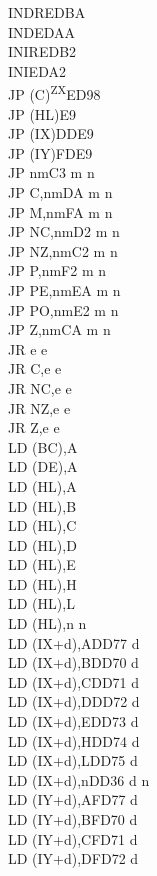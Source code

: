 \documentclass[12pt,twoside,openright,a4paper]{book}
\newcommand{\ZXN}{\textnormal{\textsuperscript{ZX}}}
\begin{document}
\begin{multicols}{3}
{\begin{tabbing}
		INDR\>EDBA\\
		IND\>EDAA\\
		INIR\>EDB2\\
		INI\>EDA2\\
		JP (C)\ZXN\>ED98\\
		JP (HL)\>E9\\
		JP (IX)\>DDE9\\
		JP (IY)\>FDE9\\
		JP nm\>C3 m n\\
		JP C,nm\>DA m n\\
		JP M,nm\>FA m n\\
		JP NC,nm\>D2 m n\\
		JP NZ,nm\>C2 m n\\
		JP P,nm\>F2 m n\\
		JP PE,nm\>EA m n\\
		JP PO,nm\>E2 m n\\
		JP Z,nm\>CA m n\\
		JR e e\\
		JR C,e e\\
		JR NC,e e\\
		JR NZ,e e\\
		JR Z,e e\\
		LD (BC),A\\
		LD (DE),A\\
		LD (HL),A\\
		LD (HL),B\\
		LD (HL),C\\
		LD (HL),D\\
		LD (HL),E\\
		LD (HL),H\\
		LD (HL),L\\
		LD (HL),n n\\
		LD (IX+d),A\>DD77 d\\
		LD (IX+d),B\>DD70 d\\
		LD (IX+d),C\>DD71 d\\
		LD (IX+d),D\>DD72 d\\
		LD (IX+d),E\>DD73 d\\
		LD (IX+d),H\>DD74 d\\
		LD (IX+d),L\>DD75 d\\
		LD (IX+d),n\>DD36 d n\\
		LD (IY+d),A\>FD77 d\\
		LD (IY+d),B\>FD70 d\\
		LD (IY+d),C\>FD71 d\\
		LD (IY+d),D\>FD72 d\\

\end{tabbing}}
\end{multicols}
\end{document}
